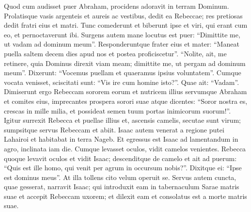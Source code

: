 \begin{biblechapter}
\begin{biblechapter}
\begin{biblechapter}
\begin{biblechapter}
\begin{biblechapter}
\begin{biblechapter}
\begin{biblechapter}
\begin{biblechapter}
\begin{biblechapter}
\begin{biblechapter}
\begin{biblechapter}
\begin{biblechapter}
\begin{biblechapter}
\begin{biblechapter}
\begin{biblechapter}
\begin{biblechapter}
\begin{biblechapter}
\begin{biblechapter}
\begin{biblechapter}
\begin{biblechapter}
\begin{biblechapter}
\begin{biblechapter}
\begin{biblechapter}
\begin{biblechapter}
 \verse Quod cum audisset puer Abraham, procidens adoravit in terram Dominum. 
\verse Prolatisque vasis argenteis et aureis ac vestibus, dedit ea Rebeccae; res pretiosas dedit fratri eius et matri. 
\verse Tunc comederunt et biberunt ipse et viri, qui erant cum eo, et pernoctaverunt ibi.
 Surgens autem mane locutus est puer: “Dimittite me, ut vadam ad dominum meum”. 
 \verse Responderuntque frater eius et mater: “Maneat puella saltem decem dies apud nos et postea proficiscetur”. 
\verse “Nolite, ait, me retinere, quia Dominus direxit viam meam; dimittite me, ut pergam ad dominum meum”. 
\verse Dixerunt: “Vocemus puellam et quaeramus ipsius voluntatem”. 
\verse Cumque vocata venisset, sciscitati sunt: “Vis ire cum homine isto?”. Quae ait: “Vadam”.
 \verse Dimiserunt ergo Rebeccam sororem eorum et nutricem illius servumque Abraham et comites eius, 
\verse imprecantes prospera sorori suae atque dicentes:
 “Soror nostra es,
 crescas in mille milia,
 et possideat semen tuum
 portas inimicorum suorum!”.
 \verse Igitur surrexit Rebecca et puellae illius et, ascensis camelis, secutae sunt virum; sumpsitque servus Rebeccam et abiit.
 \verse Isaac autem venerat a regione putei Lahairoi et habitabat in terra Nageb. 
 \verse Et egressus est Isaac ad lamentandum in agro, inclinata iam die. Cumque levasset oculos, vidit camelos venientes. 
\verse Rebecca quoque levavit oculos et vidit Isaac; descenditque de camelo 
\verse et ait ad puerum: “Quis est ille homo, qui venit per agrum in occursum nobis?”. Dixitque ei: “Ipse est dominus meus”. At illa tollens cito velum operuit se. 
\verse Servus autem cuncta, quae gesserat, narravit Isaac; 
\verse qui introduxit eam in tabernaculum Sarae matris suae et accepit Rebeccam uxorem; et dilexit eam et consolatus est a morte matris suae.
 

\end{biblechapter}
\end{biblechapter}
\end{biblechapter}
\end{biblechapter}
\end{biblechapter}
\end{biblechapter}
\end{biblechapter}
\end{biblechapter}
\end{biblechapter}
\end{biblechapter}
\end{biblechapter}
\end{biblechapter}
\end{biblechapter}
\end{biblechapter}
\end{biblechapter}
\end{biblechapter}
\end{biblechapter}
\end{biblechapter}
\end{biblechapter}
\end{biblechapter}
\end{biblechapter}
\end{biblechapter}
\end{biblechapter}
\end{biblechapter}
